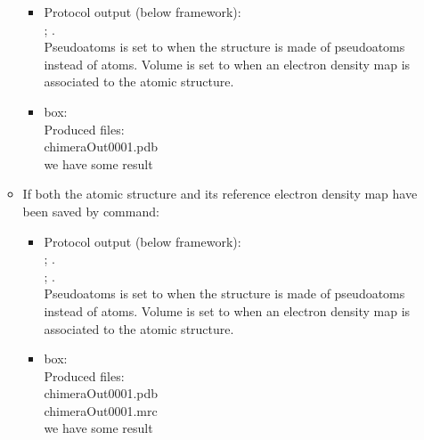 \begin{itemize}
\begin{itemize}
   \begin{itemize}
     \item Protocol output (below \scipion framework):\\ ; .\\Pseudoatoms is set to  when the structure is made of pseudoatoms instead of atoms. Volume is set to  when an electron density map is associated to the atomic structure.\\
     \item {} box:\\Produced files:\\chimeraOut0001.pdb\\we have some result\\
    \end{itemize}
    
   \item If both the atomic structure and its reference electron density map have been saved by  command:\\ 
   
   \begin{itemize}
     \item Protocol output (below \scipion framework):\\
      ; .\\
      ; .\\Pseudoatoms is set to  when the structure is made of pseudoatoms instead of atoms. Volume is set to  when an electron density map is associated to the atomic structure.\\
     \item {} box:\\Produced files:\\chimeraOut0001.pdb\\chimeraOut0001.mrc\\we have some result\\
    \end{itemize}
    
   \end{itemize} 
  
 \end{itemize}

